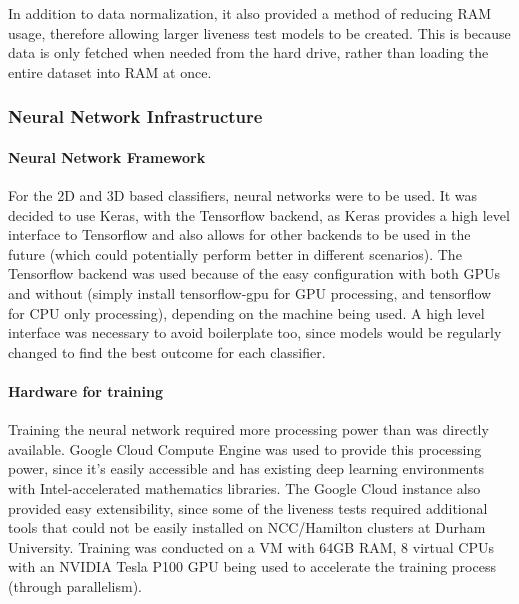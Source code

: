\documentclass[10pt,a4paper]{article}
\begin{document}
        In addition to data normalization, it also provided a method of reducing RAM usage, therefore allowing larger liveness test models to be created. This is because data is only fetched when needed
        from the hard drive, rather than loading the entire dataset into RAM at once.

        \subsubsection{Neural Network Infrastructure}
            
            \paragraph{Neural Network Framework} 
            For the 2D and 3D based classifiers, neural networks were to be used. It was decided to use Keras, with the Tensorflow backend, as Keras provides a high level interface to Tensorflow
            and also allows for other backends to be used in the future (which could potentially perform better in different scenarios). The Tensorflow backend was used because of the easy configuration
            with both GPUs and without (simply install tensorflow-gpu for GPU processing, and tensorflow for CPU only processing), depending on the machine being used. A high level interface was necessary
            to avoid boilerplate too, since models would be regularly changed to find the best outcome for each classifier.

            \paragraph{Hardware for training}
            Training the neural network required more processing power than was directly available. Google Cloud Compute Engine was used to provide this processing power, since it's easily accessible and has existing
            deep learning environments with Intel-accelerated mathematics libraries. The Google Cloud instance also provided easy extensibility, since some of the liveness tests required additional tools that could not be easily installed
            on NCC/Hamilton clusters at Durham University. Training was conducted on a VM with 64GB RAM, 8 virtual CPUs with an NVIDIA Tesla P100 GPU being used to accelerate the training process (through parallelism).
\end{document}
